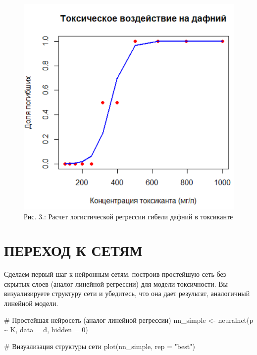 \documentclass[
  letterpaper,
  DIV=11,
  numbers=noendperiod]{scrreprt}
\newenvironment{Shaded}{\begin{snugshade}}{\end{snugshade}}
\newcommand{\AttributeTok}[1]{\textcolor[rgb]{0.40,0.45,0.13}{#1}}
\newcommand{\CommentTok}[1]{\textcolor[rgb]{0.37,0.37,0.37}{#1}}
\newcommand{\DecValTok}[1]{\textcolor[rgb]{0.68,0.00,0.00}{#1}}
\newcommand{\FunctionTok}[1]{\textcolor[rgb]{0.28,0.35,0.67}{#1}}
\newcommand{\NormalTok}[1]{\textcolor[rgb]{0.00,0.23,0.31}{#1}}
\newcommand{\OtherTok}[1]{\textcolor[rgb]{0.00,0.23,0.31}{#1}}
\newcommand{\SpecialCharTok}[1]{\textcolor[rgb]{0.37,0.37,0.37}{#1}}
\newcommand{\StringTok}[1]{\textcolor[rgb]{0.13,0.47,0.30}{#1}}
\begin{document}
\begin{figure}[H]

{\centering \includegraphics[width=0.6\linewidth,height=\textheight,keepaspectratio]{images/KOROSOV3.PNG}

}

\caption{Рис. 3.: Расчет логистической регрессии гибели дафний в
токсиканте}

\end{figure}%

\section{ПЕРЕХОД К
СЕТЯМ}\label{ux43fux435ux440ux435ux445ux43eux434-ux43a-ux441ux435ux442ux44fux43c}

Сделаем первый шаг к нейронным сетям, построив простейшую сеть без
скрытых слоев (аналог линейной регрессии) для модели токсичности. Вы
визуализируете структуру сети и убедитесь, что она дает результат,
аналогичный линейной модели.

\begin{Shaded}
\begin{Highlighting}[]
\CommentTok{\# Простейшая нейросеть (аналог линейной регрессии)}
\NormalTok{nn\_simple }\OtherTok{\textless{}{-}} \FunctionTok{neuralnet}\NormalTok{(p }\SpecialCharTok{\textasciitilde{}}\NormalTok{ K, }\AttributeTok{data =}\NormalTok{ d, }\AttributeTok{hidden =} \DecValTok{0}\NormalTok{)}

\CommentTok{\# Визуализация структуры сети}
\FunctionTok{plot}\NormalTok{(nn\_simple, }\AttributeTok{rep =} \StringTok{"best"}\NormalTok{)}
\end{Highlighting}
\end{Shaded}
\end{document}
